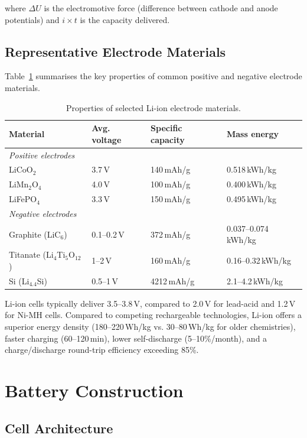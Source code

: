 where $\Delta U$ is the electromotive force (difference between cathode and anode potentials) and $i \times t$ is the capacity delivered.

\subsection{Representative Electrode Materials}

Table~\ref{tab:electrodes} summarises the key properties of common positive and negative electrode materials.

\begin{table}[ht!]
\centering
\caption{Properties of selected Li-ion electrode materials.}
\label{tab:electrodes}
\begin{tabular}{llll}
\toprule
\textbf{Material} & \textbf{Avg. voltage} & \textbf{Specific capacity} & \textbf{Mass energy} \\
\midrule
\multicolumn{4}{l}{\textit{Positive electrodes}} \\
LiCoO$_2$ & 3.7\,V & 140\,mAh/g & 0.518\,kWh/kg \\
LiMn$_2$O$_4$ & 4.0\,V & 100\,mAh/g & 0.400\,kWh/kg \\
LiFePO$_4$ & 3.3\,V & 150\,mAh/g & 0.495\,kWh/kg \\
\midrule
\multicolumn{4}{l}{\textit{Negative electrodes}} \\
Graphite (LiC$_6$) & 0.1--0.2\,V & 372\,mAh/g & 0.037--0.074\,kWh/kg \\
Titanate (Li$_4$Ti$_5$O$_{12}$) & 1--2\,V & 160\,mAh/g & 0.16--0.32\,kWh/kg \\
Si (Li$_{4.4}$Si) & 0.5--1\,V & 4212\,mAh/g & 2.1--4.2\,kWh/kg \\
\bottomrule
\end{tabular}
\end{table}

Li-ion cells typically deliver 3.5--3.8\,V, compared to 2.0\,V for lead-acid and 1.2\,V for Ni-MH cells. Compared to competing rechargeable technologies, Li-ion offers a superior energy density (180--220\,Wh/kg vs. 30--80\,Wh/kg for older chemistries), faster charging (60--120\,min), lower self-discharge (5--10\%/month), and a charge/discharge round-trip efficiency exceeding 85\%.

\section{Battery Construction}

\subsection{Cell Architecture}

